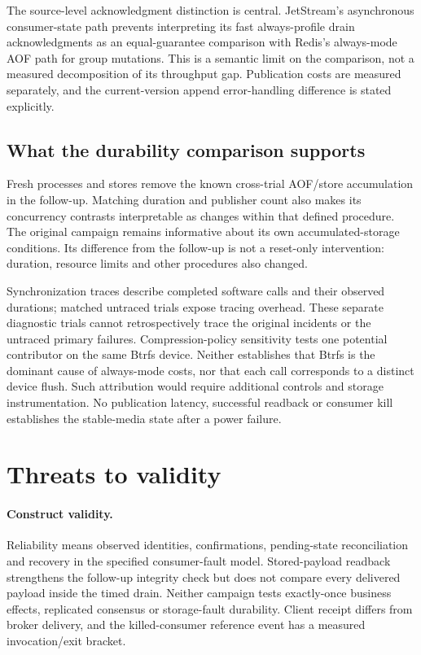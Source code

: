 \documentclass[11pt]{article}
\theoremstyle{definition}
\begin{document}
The source-level acknowledgment distinction is central. JetStream's asynchronous consumer-state path prevents interpreting its fast always-profile drain acknowledgments as an equal-guarantee comparison with Redis's always-mode AOF path for group mutations. This is a semantic limit on the comparison, not a measured decomposition of its throughput gap. Publication costs are measured separately, and the current-version append error-handling difference is stated explicitly.

\subsection{What the durability comparison supports}

Fresh processes and stores remove the known cross-trial AOF/store accumulation in the follow-up. Matching duration and publisher count also makes its concurrency contrasts interpretable as changes within that defined procedure. The original campaign remains informative about its own accumulated-storage conditions. Its difference from the follow-up is not a reset-only intervention: duration, resource limits and other procedures also changed.

Synchronization traces describe completed software calls and their observed durations; matched untraced trials expose tracing overhead. These separate diagnostic trials cannot retrospectively trace the original incidents or the untraced primary failures. Compression-policy sensitivity tests one potential contributor on the same Btrfs device. Neither establishes that Btrfs is the dominant cause of always-mode costs, nor that each call corresponds to a distinct device flush. Such attribution would require additional controls and storage instrumentation. No publication latency, successful readback or consumer kill establishes the stable-media state after a power failure.

\section{Threats to validity}\label{sec:validity}

\paragraph{Construct validity.}
Reliability means observed identities, confirmations, pending-state reconciliation and recovery in the specified consumer-fault model. Stored-payload readback strengthens the follow-up integrity check but does not compare every delivered payload inside the timed drain. Neither campaign tests exactly-once business effects, replicated consensus or storage-fault durability. Client receipt differs from broker delivery, and the killed-consumer reference event has a measured invocation/exit bracket.
\end{document}
